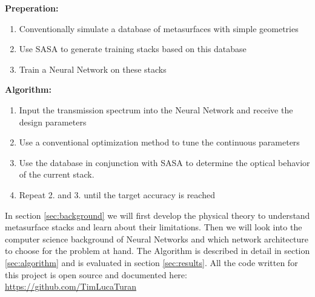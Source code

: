 \textbf{Preperation:}
\begin{enumerate}
    \item Conventionally simulate a database of metasurfaces with simple geometries

    \item Use SASA to generate training stacks based on this database

    \item Train a Neural Network on these stacks
\end{enumerate}

\textbf{Algorithm:}
\begin{enumerate}
    \item Input the transmission spectrum into the Neural Network and receive the design parameters

    \item Use a conventional optimization method to tune the continuous parameters

    \item Use the database in conjunction with SASA to determine the optical behavior of the current stack.

    \item Repeat 2. and 3. until the target accuracy is reached
\end{enumerate}

\newpage

In section \ref{sec:background} we will first develop the physical theory to understand metasurface stacks and learn about their limitations. Then we will look into the computer science background of Neural Networks and which network architecture to choose for the problem at hand. The Algorithm is described in detail in section \ref{sec:algorithm} and is evaluated in section \ref{sec:results}.
All the code written for this project is open source and documented here: \url{https://github.com/TimLucaTuran}
